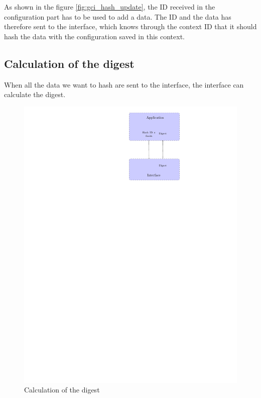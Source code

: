 As shown in the figure \ref{fig:gci_hash_update}, the ID received in the
configuration part has to be used to add a data.
The ID and the data has therefore sent to the interface, which knows through the
context ID that it should hash the data with the configuration saved in this
context.

\subsection*{Calculation of the digest}

When all the data we want to hash are sent to the interface, the interface can
calculate the digest.

\begin{figure}[!ht]
\centering
\includegraphics[trim=18.5cm 20.5cm 13.5cm 0cm]{figures/hash_example_finish.pdf}
\caption{Calculation of the digest}
\label{fig:gci_hash_finish}
\end{figure}

